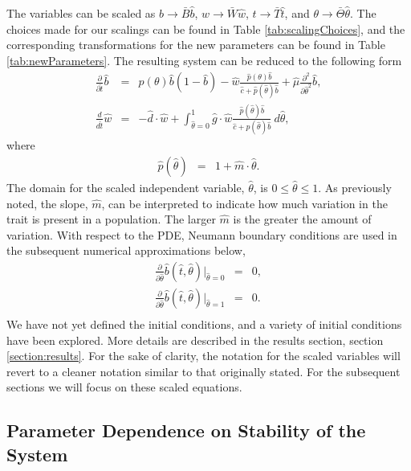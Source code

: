 \documentclass[review,authoryear]{elsarticle}
\newcommand{\origB}{{b}}
\newcommand{\origW}{{w}}
\newcommand{\origTheta}{{\theta}}
\newcommand{\origT}{{t}}
\newcommand{\scaledB}{\hat{b}}
\newcommand{\scaledW}{\hat{w}}
\newcommand{\scaledC}{\hat{c}}
\newcommand{\scaledD}{\hat{d}}
\newcommand{\scaledG}{\hat{g}}
\newcommand{\scaledP}[1]{\hat{p}(#1)}
\newcommand{\scaledTheta}{\hat{\theta}}
\newcommand{\scaledT}{\hat{t}}
\newcommand{\scaledMu}{\hat{\mu}}
\newcommand{\scaledM}{\hat{m}}
\begin{document}
The variables can be scaled as $\origB\rightarrow \bar{B}\scaledB$,
$\origW\rightarrow \bar{W}\scaledW$, $\origT\rightarrow \bar{T}\scaledT$, and
$\origTheta\rightarrow \bar{\Theta}\scaledTheta$. The choices made for our
scalings can be found in Table \ref{tab:scalingChoices}, and the
corresponding transformations for the new parameters can be found in
Table \ref{tab:newParameters}.  The resulting system can be reduced to
the following form
\begin{eqnarray}
  \label{eq:scaledodePDE1}
  \frac{\partial}{\partial \scaledT} \scaledB & = &
      p(\theta) \scaledB (1 - \scaledB)
      -  \scaledW \frac{\scaledP{\theta} \scaledB}{\scaledC+\scaledP{\scaledTheta}\scaledB}
      + \scaledMu \frac{\partial^2}{\partial \scaledTheta^2} \scaledB , \\
  \label{eq:scaledodePDE2}
  \frac{d}{d\scaledT} \scaledW & = & -\scaledD \cdot \scaledW +
      \int^1_{\scaledTheta=0} \scaledG \cdot \scaledW \frac{\scaledP{\scaledTheta} \scaledB }{\scaledC + \scaledP{\scaledTheta} \scaledB} ~ d\scaledTheta,
\end{eqnarray}
where
\begin{eqnarray}
    \label{eq:definitionP}
  \scaledP{\scaledTheta} & = & 1 + \scaledM \cdot \scaledTheta.
\end{eqnarray}
The domain for the scaled independent variable, $\scaledTheta$, is
$0\leq\scaledTheta\leq 1$. As previously noted, the slope, $\scaledM$, can be
interpreted to indicate how much variation in the trait is present in
a population. The larger $\scaledM$ is the greater the amount of variation.
With respect to the PDE, Neumann boundary conditions are used in the
subsequent numerical approximations below,
\begin{eqnarray*}
  \frac{\partial}{\partial\scaledTheta} \scaledB(\scaledT,\scaledTheta) \bigg|_{\scaledTheta=0} & = & 0, \\
  \frac{\partial}{\partial\scaledTheta} \scaledB(\scaledT,\scaledTheta) \bigg|_{\scaledTheta=1} & = & 0. \\
\end{eqnarray*}
We have not yet defined the initial conditions, and
a variety of initial
conditions have been explored. More details are  described in the results
section, section \ref{section:results}. For the sake of clarity, the notation for the scaled variables will revert to a cleaner notation similar to that originally stated. For the subsequent sections we will focus on these scaled equations.


\subsection{Parameter Dependence on Stability of the System}
\label{subsection:parameters}
\end{document}
